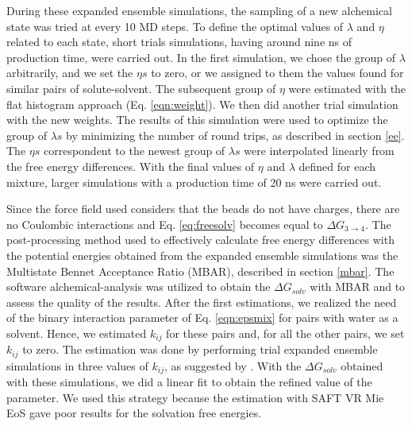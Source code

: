During these expanded ensemble simulations, the sampling of a new alchemical state was tried at every 10 MD steps. To define the optimal values of $\lambda$ and $\eta$ related to each state, short trials simulations, having around nine ns of production time, were carried out. In the first simulation, we chose the group of $\lambda$ arbitrarily, and we set the $\eta s$ to zero, or we assigned to them the values found for similar pairs of solute-solvent. The subsequent group of $\eta$ were estimated with the flat histogram approach (Eq. \eqref{eqn:weight}). We then did another trial simulation with the new weights. The results of this simulation were used to optimize the group of $\lambda s$ by minimizing the number of round trips, as described in section \ref{ee}. The $\eta s$ correspondent to the newest group of $\lambda s$ were interpolated linearly from the free energy differences. With the final values of $\eta$ and $\lambda $ defined for each mixture, larger simulations with a production time of 20 ns were carried out. 

Since the force field used considers that the beads do not have charges, there are no Coulombic interactions and Eq. \eqref{eq:freesolv} becomes equal to $\Delta G_{3 \rightarrow 4} $. The post-processing method used to effectively calculate free energy differences with the potential energies obtained from the expanded ensemble simulations was the Multistate Bennet Acceptance Ratio (MBAR), described in section \ref{mbar}. The software alchemical-analysis \cite{klimovich} was utilized to obtain the $\Delta G_{solv}$ with MBAR and to assess the quality of the results. After the first estimations, we realized the need of the binary interaction parameter of Eq. \eqref{eqn:epsmix} for pairs with water as a solvent. Hence, we estimated  $k_{ij}$ for these pairs and, for all the other pairs, we set  $k_{ij}$ to zero. The estimation was done by performing trial expanded ensemble simulations in three values of $k_{ij}$, as suggested by . With the $\Delta G_{solv}$ obtained with these simulations, we did a linear fit to obtain the refined value of the parameter. We used this strategy because the estimation with SAFT VR Mie EoS gave poor results for the solvation free energies.

